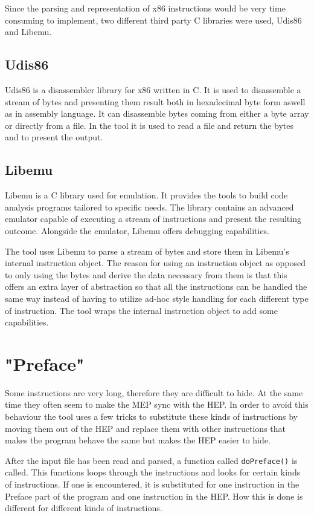 \documentclass[11pt,twoside]{eitExjobb}
\begin{document}
Since the parsing and representation of x86 instructions would be very time consuming to implement, two different third party C libraries were used, Udis86 and Libemu. 

\subsection{Udis86}
Udis86\cite{udis} is a disassembler library for x86 written in C. It is used to disassemble a stream of bytes and presenting them result both in hexadecimal byte form aswell as in assembly language. It can disassemble bytes coming from either a byte array or directly from a file. In the tool it is used to read a file and return the bytes and to present the output.


\subsection{Libemu}
Libemu\cite{libemu} is a C library used for emulation. It provides the tools to build code analysis programs tailored to specific needs. The library contains an advanced emulator capable of executing a stream of instructions and present the resulting outcome. Alongside the emulator, Libemu offers debugging capabilities.

The tool uses Libemu to parse a stream of bytes and store them in Libemu's internal instruction object. The reason for using an instruction object as opposed to only using the bytes and derive the data necessary from them is that this offers an extra layer of abstraction so that all the instructions can be handled the same way instead of having to utilize ad-hoc style handling for each different type of instruction. The tool wraps the internal instruction object to add some capabilities.

\section{"Preface"}
Some instructions are very long, therefore they are difficult to hide. At the same time they often seem to make the MEP sync with the HEP. In order to avoid this behaviour the tool uses a few tricks to substitute these kinds of instructions by moving them out of the HEP and replace them with other instructions that makes the program behave the same but makes the HEP easier to hide. 

After the input file has been read and parsed, a function called \texttt{doPreface()} is called. This functions loops through the instructions and looks for certain kinds of instructions. If one is encountered, it is substituted for one instruction in the Preface part of the program and one instruction in the HEP. How this is done is different for different kinds of instructions.  
\end{document}
